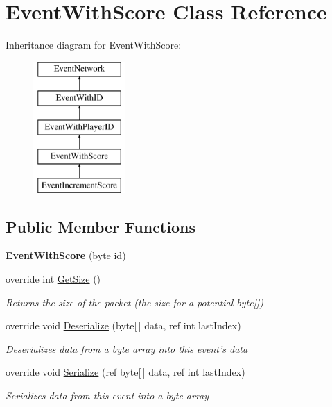 \hypertarget{class_event_with_score}{\section{Event\-With\-Score Class Reference}
\label{class_event_with_score}
}
Inheritance diagram for Event\-With\-Score\-:\begin{figure}[H]
\begin{center}
\leavevmode
\includegraphics[height=5.000000cm]{class_event_with_score}
\end{center}
\end{figure}
\subsection*{Public Member Functions}
\begin{DoxyCompactItemize}
\item 
\hypertarget{class_event_with_score_afed686cec337ad6ba846ce5975194e09}{{\bfseries Event\-With\-Score} (byte id)}\label{class_event_with_score_afed686cec337ad6ba846ce5975194e09}

\item 
override int \hyperlink{class_event_with_score_ab5f63f2cd2bd7c3a63daaf04bf97d50a}{Get\-Size} ()
\begin{DoxyCompactList}\small\item\em Returns the size of the packet (the size for a potential byte\mbox{[}\mbox{]}) \end{DoxyCompactList}\item 
override void \hyperlink{class_event_with_score_a101e7edd3e63e1cf8db19f52d54c0041}{Deserialize} (byte\mbox{[}$\,$\mbox{]} data, ref int last\-Index)
\begin{DoxyCompactList}\small\item\em Deserializes data from a byte array into this event's data \end{DoxyCompactList}\item 
override void \hyperlink{class_event_with_score_accd96632d7beb8ef3bf539f6c8eec7c9}{Serialize} (ref byte\mbox{[}$\,$\mbox{]} data, ref int last\-Index)
\begin{DoxyCompactList}\small\item\em Serializes data from this event into a byte array \end{DoxyCompactList}\end{DoxyCompactItemize}
